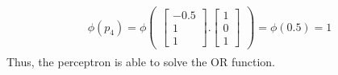 \begin{align}
  \nonumber
  \begin{matrix}
    \phi(p_4) = \phi\begin{pmatrix}
      \begin{bmatrix}
        -0.5 \\
        1 \\
        1 
      \end{bmatrix}.\begin{bmatrix}
        1 \\
        0 \\
        1
      \end{bmatrix}
    \end{pmatrix} = \phi(0.5) = 1
  \end{matrix}
\end{align}
Thus, the perceptron is able to solve the OR function.

